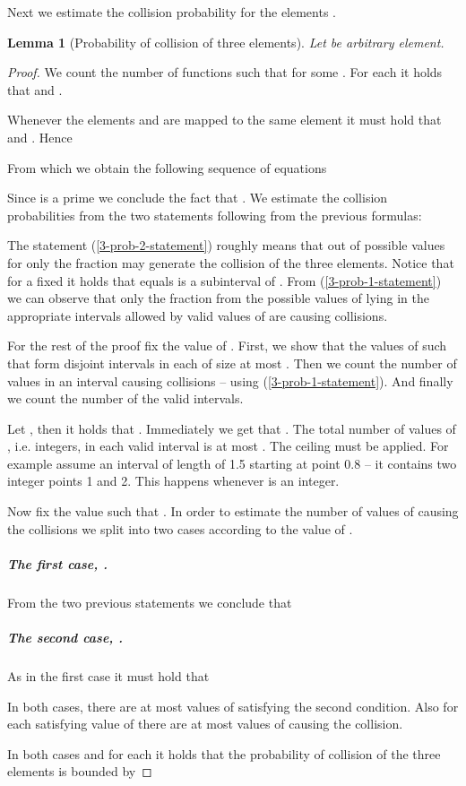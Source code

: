 \documentclass{article}
\newtheorem{lemma}{Lemma}
\begin{document}
Next we estimate the collision probability for the elements .

\begin{lemma}[Probability of collision of three elements]
\label{lemma:probability-3-elements}
Let  be arbitrary element.

\end{lemma}
\begin{proof}
We count the number of functions  such that  for some .
For each  it holds that  and .

Whenever the elements  and  are mapped to the same element  it must hold that  and . Hence

From which we obtain the following sequence of equations



Since  is a prime we conclude the fact that .
We estimate the collision probabilities from the two statements following from the previous formulas:


The statement (\ref{3-prob-2-statement}) roughly means that out of  possible values for  only the  fraction may generate the collision of the three elements. Notice that for a fixed  it holds that  equals is a subinterval of .
From (\ref{3-prob-1-statement}) we can observe that only the  fraction from the possible values of  lying in the appropriate intervals allowed by valid values of  are causing collisions.

For the rest of the proof fix the value of . 
First, we show that the values of  such that  form disjoint intervals in  each of size at most .
Then we count the number of values  in an interval causing collisions -- using (\ref{3-prob-1-statement}).
And finally we count the number of the valid intervals.

Let , then it holds that . Immediately we get that . The total number of values of , i.e. integers, in each valid interval is at most . The ceiling must be applied. For example assume an interval of length of 1.5 starting at point 0.8 -- it contains two integer points 1 and 2. This happens whenever  is an integer.

Now fix the value  such that .
In order to estimate the number of values of  causing the collisions we split into two cases according to the value of .

\subparagraph{The first case, .} 
From the two previous statements we conclude that


\subparagraph{The second case, .}
As in the first case it must hold that


In both cases, there are at most  values of  satisfying the second condition.
Also for each satisfying value of  there are at most  values of  causing the collision.

In both cases and for each  it holds that the probability of collision of the three elements is bounded by

\end{proof}
\end{document}
